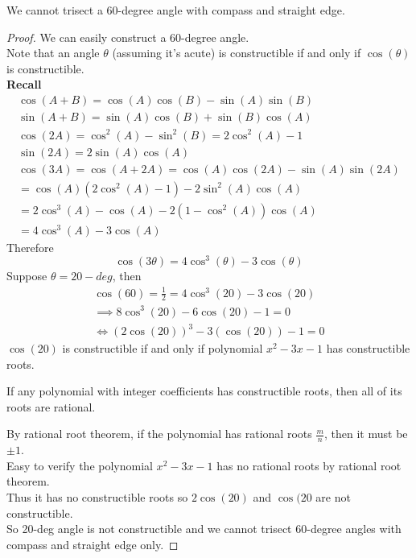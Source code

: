\documentclass[10pt]{article}
\begin{document}
		\begin{proposition}
			We cannot trisect a 60-degree angle with compass and straight edge.
		\end{proposition}
		\begin{proof}
			We can easily construct a 60-degree angle. \\
			Note that an angle $\theta$ (assuming it's acute) is constructible if and only if $\cos(\theta)$ is constructible. \\
			\textbf{Recall}
			\begin{gather*}
				\cos(A+B) = \cos(A)\cos(B) - \sin(A)\sin(B) \\
				\sin(A+B) = \sin(A)\cos(B) + \sin(B)\cos(A) \\
				\cos(2A) = \cos^2(A) - \sin^2(B) = 2\cos^2(A) - 1 \\
				\sin(2A) = 2\sin(A)\cos(A) \\
				\cos(3A) = \cos(A + 2A) = \cos(A) \cos(2A) - \sin(A) \sin(2A) \\
				= \cos(A) (2\cos^2(A) - 1) - 2\sin^2(A)\cos(A) \\
				= 2\cos^3(A) - \cos(A) - 2(1-\cos^2(A))\cos(A) \\
				= 4 \cos^3(A) - 3\cos(A)
			\end{gather*}
			Therefore 
			\[
				\cos(3\theta) = 4 \cos^3(\theta) - 3\cos(\theta)
			\]
			Suppose $\theta = 20-deg$, then 
			\begin{gather*}
				\cos(60) = \frac{1}{2} = 4 \cos^3(20) - 3\cos(20) \\
				\implies 8 \cos^3(20) - 6 \cos(20) - 1 = 0 \\
				\iff (2\cos(20))^3 - 3(\cos(20)) -1 = 0
			\end{gather*}
			$\cos(20)$ is constructible if and only if polynomial $x^2 - 3 x - 1$ has constructible roots. \\
			\begin{theorem}
				If any polynomial with integer coefficients has constructible roots, then all of its roots are rational.
			\end{theorem}
			By rational root theorem, if the polynomial has rational roots $\frac{m}{n}$, then it must be $\pm 1$.\\
			Easy to verify the polynomial $x^2 - 3x - 1$ has no rational roots by rational root theorem. \\
			Thus it has no constructible roots so $2\cos(20)$ and $\cos(20$ are not constructible. \\
			So 20-deg angle is not constructible and we cannot trisect 60-degree angles with compass and straight edge only.
		\end{proof}
		
\end{document}
